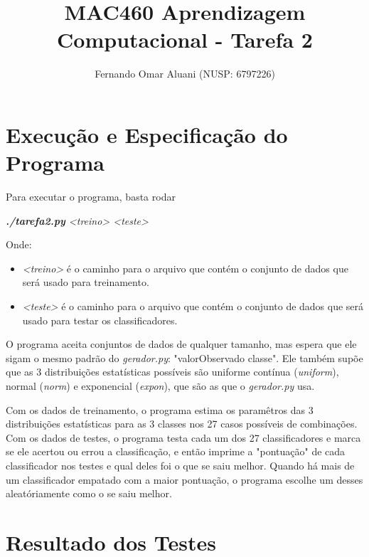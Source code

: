 \documentclass[a4paper,11pt]{article}
\title{MAC460 Aprendizagem Computacional - Tarefa 2}
\author{Fernando Omar Aluani (NUSP: 6797226)}
\begin{document}
\maketitle

\section{Execução e Especificação do Programa}
Para executar o programa, basta rodar 
\begin{center}
\textit{ \textbf{./tarefa2.py} <treino> <teste> }
\end{center}
Onde:
\begin{itemize}
  \item \textit{<treino>} é o caminho para o arquivo que contém o conjunto de dados que será usado para treinamento.
  \item \textit{<teste>} é o caminho para o arquivo que contém o conjunto de dados que será usado para testar os classificadores.
\end{itemize}

O programa aceita conjuntos de dados de qualquer tamanho, mas espera que ele sigam o mesmo padrão do \textit{gerador.py}:
"valorObservado classe". Ele também supõe que as 3 distribuições estatísticas possíveis são uniforme contínua (\textit{uniform}), 
normal (\textit{norm}) e exponencial (\textit{expon}), que são as que o \textit{gerador.py} usa.

Com os dados de treinamento, o programa estima os paramêtros das 3 distribuições estatísticas para as 3 classes nos 27 casos possíveis
de combinações. Com os dados de testes, o programa testa cada um dos 27 classificadores e marca se ele acertou ou errou a classificação,
e então imprime a "pontuação" de cada classificador nos testes e qual deles foi o que se saiu melhor. Quando há mais de um classificador
empatado com a maior pontuação, o programa escolhe um desses aleatóriamente como o se saiu melhor.

\section{Resultado dos Testes}
\end{document}

